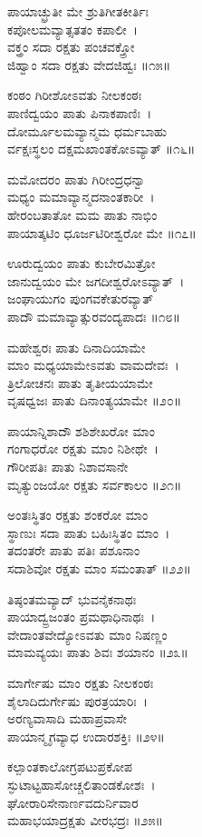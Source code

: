 ಪಾಯಾಚ್ಛ್ರುತೀ ಮೇ ಶ್ರುತಿಗೀತಕೀರ್ತಿಃ\\ಕಪೋಲಮವ್ಯಾತ್ಸತತಂ ಕಪಾಲೀ~।\\
ವಕ್ತ್ರಂ ಸದಾ ರಕ್ಷತು ಪಂಚವಕ್ತ್ರೋ\\ಜಿಹ್ವಾಂ ಸದಾ ರಕ್ಷತು ವೇದಜಿಹ್ವಃ ॥೧೫॥

ಕಂಠಂ ಗಿರೀಶೋಽವತು ನೀಲಕಂಠಃ\\ಪಾಣಿದ್ವಯಂ ಪಾತು ಪಿನಾಕಪಾಣಿಃ~।\\
ದೋರ್ಮೂಲಮವ್ಯಾನ್ಮಮ ಧರ್ಮಬಾಹು\\ರ್ವಕ್ಷಃಸ್ಥಲಂ ದಕ್ಷಮಖಾಂತಕೋಽವ್ಯಾತ್ ॥೧೬॥

ಮಮೋದರಂ ಪಾತು ಗಿರೀಂದ್ರಧನ್ವಾ\\ಮಧ್ಯಂ ಮಮಾವ್ಯಾನ್ಮದನಾಂತಕಾರೀ~।\\
ಹೇರಂಬತಾತೋ ಮಮ ಪಾತು ನಾಭಿಂ\\ಪಾಯಾತ್ಕಟಿಂ ಧೂರ್ಜಟಿರೀಶ್ವರೋ ಮೇ ॥೧೭॥

ಊರುದ್ವಯಂ ಪಾತು ಕುಬೇರಮಿತ್ರೋ\\ಜಾನುದ್ವಯಂ ಮೇ ಜಗದೀಶ್ವರೋಽವ್ಯಾತ್~।\\
ಜಂಘಾಯುಗಂ ಪುಂಗವಕೇತುರವ್ಯಾತ್\\ಪಾದೌ ಮಮಾವ್ಯಾತ್ಸುರವಂದ್ಯಪಾದಃ ॥೧೮॥

ಮಹೇಶ್ವರಃ ಪಾತು ದಿನಾದಿಯಾಮೇ\\ಮಾಂ ಮಧ್ಯಯಾಮೇಽವತು ವಾಮದೇವಃ~।\\
ತ್ರಿಲೋಚನಃ ಪಾತು ತೃತೀಯಯಾಮೇ\\ವೃಷಧ್ವಜಃ ಪಾತು ದಿನಾಂತ್ಯಯಾಮೇ ॥೨೦॥

ಪಾಯಾನ್ನಿಶಾದೌ ಶಶಿಶೇಖರೋ ಮಾಂ\\ಗಂಗಾಧರೋ ರಕ್ಷತು ಮಾಂ ನಿಶೀಥೇ~।\\
ಗೌರೀಪತಿಃ ಪಾತು ನಿಶಾವಸಾನೇ\\ಮೃತ್ಯುಂಜಯೋ ರಕ್ಷತು ಸರ್ವಕಾಲಂ ॥೨೧॥

ಅಂತಃಸ್ಥಿತಂ ರಕ್ಷತು ಶಂಕರೋ ಮಾಂ\\ಸ್ಥಾಣುಃ ಸದಾ ಪಾತು ಬಹಿಃಸ್ಥಿತಂ ಮಾಂ~।\\
ತದಂತರೇ ಪಾತು ಪತಿಃ ಪಶೂನಾಂ\\ಸದಾಶಿವೋ ರಕ್ಷತು ಮಾಂ ಸಮಂತಾತ್ ॥೨೨॥

ತಿಷ್ಠಂತಮವ್ಯಾದ್ ಭುವನೈಕನಾಥಃ\\ಪಾಯಾದ್ವ್ರಜಂತಂ ಪ್ರಮಥಾಧಿನಾಥಃ~।\\
ವೇದಾಂತವೇದ್ಯೋಽವತು ಮಾಂ ನಿಷಣ್ಣಂ\\ ಮಾಮವ್ಯಯಃ ಪಾತು ಶಿವಃ ಶಯಾನಂ ॥೨೩॥

ಮಾರ್ಗೇಷು ಮಾಂ ರಕ್ಷತು ನೀಲಕಂಠಃ\\ಶೈಲಾದಿದುರ್ಗೇಷು ಪುರತ್ರಯಾರಿಃ~।\\
ಅರಣ್ಯವಾಸಾದಿ ಮಹಾಪ್ರವಾಸೇ\\ಪಾಯಾನ್ಮೃಗವ್ಯಾಧ ಉದಾರಶಕ್ತಿಃ ॥೨೪॥

ಕಲ್ಪಾಂತಕಾಲೋಗ್ರಪಟುಪ್ರಕೋಪ\\ಸ್ಫುಟಾಟ್ಟಹಾಸೋಚ್ಚಲಿತಾಂಡಕೋಶಃ~।\\
ಘೋರಾರಿಸೇನಾರ್ಣವದುರ್ನಿವಾರ\\ಮಹಾಭಯಾದ್ರಕ್ಷತು ವೀರಭದ್ರಃ ॥೨೫॥

